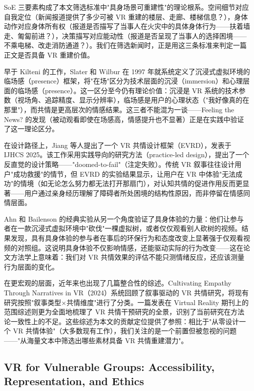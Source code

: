 SoE 三要素构成了本文筛选标准中"具身场景可重建性"的理论根系。空间细节对应自我定位（新闻报道提供了多少可被 VR 重建的楼层、走廊、楼梯信息？），身体动作对应身体所有权（报道是否描写了当事人在火灾中的具体身体行为——扶着墙走、匍匐前进？），决策描写对应能动性（报道是否呈现了当事人的选择困境——不乘电梯、改走消防通道？）。我们在筛选新闻时，正是用这三条标准来判定一篇正文是否具备 VR 重建价值。

早于 Kilteni 的工作，Slater 和 Wilbur 在 1997 年就系统定义了沉浸式虚拟环境的临场感（presence）框架，将"在场"区分为技术层面的沉浸（immersion）和心理层面的临场感（presence）\cite{slater1997five}。这一区分至今仍有理论价值：沉浸是 VR 系统的技术参数（视场角、追踪精度、显示分辨率），临场感是用户的心理状态（"我好像真的在那里"），而共情是更高层次的情感结果。这三者不能混为一谈——Feeling the News? 的发现（被动观看即使在场感高，情感提升也不显著）\cite{feelingnews2023}正是在实践中验证了这一理论区分。

在设计路径上，Jiang 等人提出了一个 VR 共情设计框架（EVRD），发表于 IJHCS 2025。该工作采用实践导向的研究方法（practice-led design），提出了一个反直觉的设计策略——"doomed-to-fail"（注定失败）。传统 VR 叙事往往设计用户"成功救援"的情节，但 EVRD 的实验结果显示，让用户在 VR 中体验"无法成功"的情境（如无论怎么努力都无法打开那扇门），对认知共情的促进作用反而更显著——用户通过亲身经历理解了障碍者所处困境的结构性原因，而非停留在情感同情层面\cite{evrd2025}。

Ahn 和 Bailenson 的经典实验从另一个角度验证了具身体验的力量：他们让参与者在一款沉浸式虚拟环境中"砍伐"一棵虚拟树，或者仅仅观看别人砍树的视频。结果发现，具有具身体验的参与者在事后的环保行为和态度改变上显著强于仅观看视频的对照组\cite{ahn2013embodied}\cite{ahn2014short}。这说明具身体验不仅影响情感，还能驱动实际的行为改变——这在论文方法学上意味着：我们对 VR 共情效果的评估不能只测情绪反应，还应该测量行为层面的变化。

在更宏观的层面，近年来也出现了几篇整合性的综述。Cultivating Empathy Through Narratives in VR（2024）系统回顾了叙事驱动的 VR 共情研究，将现有研究按照"叙事类型×共情维度"进行了分类\cite{cultivating2024}。一篇发表在 Virtual Reality 期刊上的范围综述则更为全面地梳理了 VR 共情干预研究的全景，识别了当前研究在方法论一致性上的不足\cite{vrscoping2024}。这些综述为本文的贡献定位提供了参照：相比于"从零设计一个 VR 共情体验"（大多数现有工作），我们关注的是一个前置但被忽视的问题——"从海量文本中筛选出哪些素材具备 VR 共情重建潜力"。

\subsection{VR for Vulnerable Groups: Accessibility, Representation, and Ethics}

